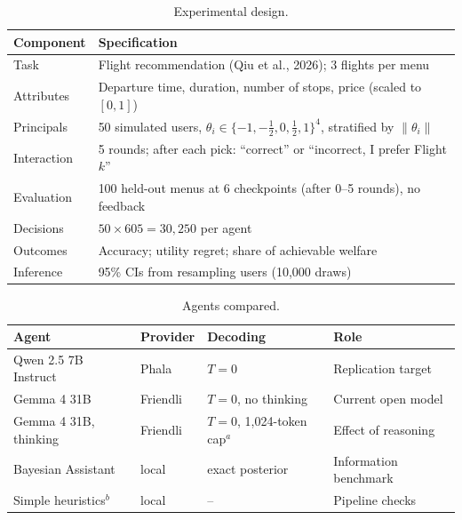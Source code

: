 
\begin{table}[t]
\centering
\caption{Experimental design.}
\label{tab:design}
\begin{tabular}{@{}ll@{}}
\toprule
Component & Specification \\
\midrule
Task & Flight recommendation (Qiu et al., 2026); 3 flights per menu \\
Attributes & Departure time, duration, number of stops, price (scaled to $[0,1]$) \\
Principals & 50 simulated users, $\theta_i \in \{-1,-\tfrac12,0,\tfrac12,1\}^4$, stratified by $\lVert\theta_i\rVert$ \\
Interaction & 5 rounds; after each pick: ``correct'' or ``incorrect, I prefer Flight $k$'' \\
Evaluation & 100 held-out menus at 6 checkpoints (after 0--5 rounds), no feedback \\
Decisions & $50 \times 605 = 30{,}250$ per agent \\
Outcomes & Accuracy; utility regret; share of achievable welfare \\
Inference & 95\% CIs from resampling users (10{,}000 draws) \\
\bottomrule
\end{tabular}
\end{table}
\clearpage

\begin{table}[t]
\centering
\caption{Agents compared.}
\label{tab:agents}
\small
\begin{tabular}{@{}llll@{}}
\toprule
Agent & Provider & Decoding & Role \\
\midrule
Qwen 2.5 7B Instruct & Phala & $T=0$ & Replication target \\
Gemma 4 31B & Friendli & $T=0$, no thinking & Current open model \\
Gemma 4 31B, thinking & Friendli & $T=0$, 1{,}024-token cap$^{a}$ & Effect of reasoning \\
Bayesian Assistant & local & exact posterior & Information benchmark \\
Simple heuristics$^{b}$ & local & -- & Pipeline checks \\
\bottomrule
\end{tabular}
\par{}
\end{table}
\clearpage

